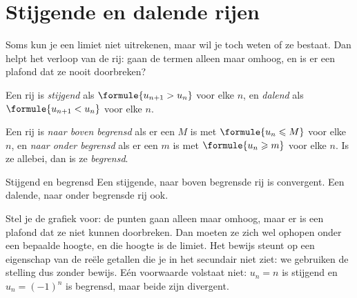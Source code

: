 \begin{oefeningen}
\end{oefeningen}

\section{Stijgende en dalende rijen}

Soms kun je een limiet niet uitrekenen, maar wil je toch weten of ze bestaat. Dan helpt het verloop van de rij: gaan de termen alleen maar omhoog, en is er een plafond dat ze nooit doorbreken?

\begin{theorie}
Een rij is \emph{stijgend} als $\formule{u_{n+1} > u_n}$ voor elke $n$, en \emph{dalend} als $\formule{u_{n+1} < u_n}$ voor elke $n$.

\vspace{1mm}
Een rij is \emph{naar boven begrensd} als er een $M$ is met $\formule{u_n \leqslant M}$ voor elke $n$, en \emph{naar onder begrensd} als er een $m$ is met $\formule{u_n \geqslant m}$ voor elke $n$. Is ze allebei, dan is ze \emph{begrensd}.

\begin{stelling}{Stijgend en begrensd}
Een stijgende, naar boven begrensde rij is convergent. Een dalende, naar onder begrensde rij ook.
\end{stelling}
\end{theorie}

Stel je de grafiek voor: de punten gaan alleen maar omhoog, maar er is een plafond dat ze niet kunnen doorbreken. Dan moeten ze zich wel ophopen onder een bepaalde hoogte, en die hoogte is de limiet. Het bewijs steunt op een eigenschap van de reële getallen die je in het secundair niet ziet: we gebruiken de stelling dus zonder bewijs. Eén voorwaarde volstaat niet: $u_n = n$ is stijgend en $u_n = (-1)^n$ is begrensd, maar beide zijn divergent.

